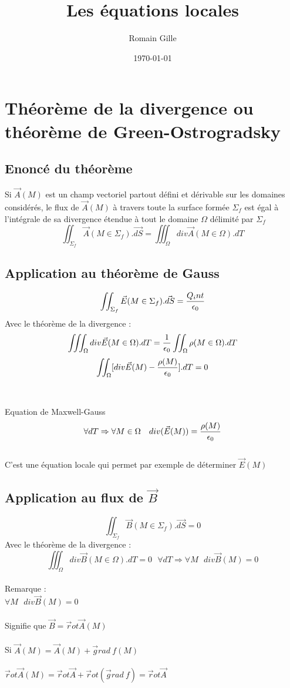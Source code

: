 \documentclass[11pt]{article}
\title{Les équations locales}
\author{Romain Gille}
\date{\today}
\begin{document}
\maketitle
\newpage
\section{Théorème de la divergence ou théorème de Green-Ostrogradsky}
\subsection{Enoncé du théorème}
Si $\vec{A}(M)$ est un champ vectoriel partout défini et dérivable sur les domaines considérés, le flux de $\vec{A}(M)$ à travers toute la surface formée $\Sigma_f$ est égal à l'intégrale de sa divergence étendue à tout le domaine $\Omega$ délimité par $\Sigma_f$
$$ \iint_{\Sigma_f}{\vec{A}(M \in \Sigma_f)}.\vec{dS} = \iiint_{\Omega}{div \vec{A}(M \in \Omega)}.dT$$
\subsection{Application au théorème de Gauss}
$$\iint_{\Sigma_f}{\vec{E}(M \in \Sigma_f)}.\vec{dS} = {{Q_int} \over {\epsilon_0}}$$
Avec le théorème de la divergence : 
$$\iiint_{\Omega}{div \vec{E}(M \in \Omega)}.dT = { 1 \over \epsilon_0} \iint_\Omega \rho(M \in \Omega).dT$$
$$\iint_{\Omega}[ div \vec E(M) - {\rho(M) \over \epsilon_0} ].dT = 0$$ \\
\\
Equation de Maxwell-Gauss
$$\forall dT \Rightarrow \forall M \in \Omega ~~~ div(\vec{E}(M)) = {\rho (M) \over \epsilon_0}$$
\\
C'est une équation locale qui permet par exemple de déterminer $\vec{E}(M)$
\newpage
\subsection{Application au flux de $\vec B$}
$$\iint_{\Sigma_f}{\vec{B}(M \in \Sigma_f)}.\vec{dS} = 0$$
Avec le théorème de la divergence : 
$$\iiint_{\Omega}{div \vec{B}(M \in \Omega)}.dT = 0 ~~~ \forall dT \Rightarrow \forall M ~~~ div \vec{B}(M) = 0$$
\\
Remarque : \\
$\forall M ~~~ div\vec{B}(M) = 0$ \\
\\
Signifie que $\vec B = \vec rot \vec A(M)$ \\
\\
Si $\vec A(M) = \vec A(M) + \vec grad ~ f(M)$ \\
\\
$\vec rot \vec A(M) = \vec rot \vec A + \vec rot(\vec grad ~ f) = \vec rot \vec A$
\end{document}
